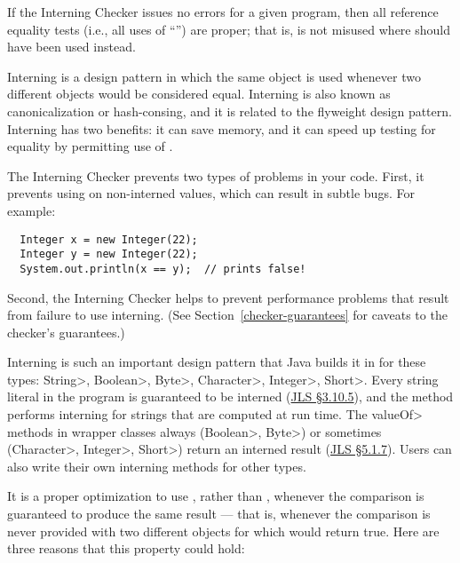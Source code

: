 \htmlhr
{}

If the Interning Checker issues no errors for a given program, then all
reference equality tests (i.e., all uses of ``\code{==}'') are proper;
that is,
\code{==} is not misused where  should have been used instead.

Interning is a design pattern in which the same object is used whenever two
different objects would be considered equal.  Interning is also known as
canonicalization or hash-consing, and it is related to the flyweight design
pattern.
Interning has two benefits:  it can save memory, and it can speed up testing for
equality by permitting use of \code{==}.

The Interning Checker prevents two types of problems in your code.
First, it prevents using \code{==} on
non-interned values, which can result in subtle bugs.  For example:

\begin{Verbatim}
  Integer x = new Integer(22);
  Integer y = new Integer(22);
  System.out.println(x == y);  // prints false!
\end{Verbatim}

\noindent
Second,
the Interning Checker helps to prevent performance problems that result
from failure to use interning.
(See Section~\ref{checker-guarantees} for caveats to the checker's guarantees.)

Interning is such an important design pattern that Java builds it in for
these types: \<String>, \<Boolean>, \<Byte>, \<Character>, \<Integer>,
\<Short>.  Every string literal in the program is guaranteed to be interned
(\href{https://docs.oracle.com/javase/specs/jls/se11/html/jls-3.html#jls-3.10.5}{JLS
  \S3.10.5}), and the
 method
performs interning for strings that are computed at run time.
The \<valueOf> methods in wrapper classes always (\<Boolean>, \<Byte>) or
sometimes (\<Character>, \<Integer>, \<Short>) return an interned result
(\href{https://docs.oracle.com/javase/specs/jls/se11/html/jls-5.html#jls-5.1.7}{JLS \S5.1.7}).
Users can also write their own interning methods for other types.

It is a proper optimization to use \code{==}, rather than ,
whenever the comparison is guaranteed to produce the same result --- that
is, whenever the comparison is never provided with two different objects
for which  would return true.  Here are three reasons that
this property could hold:

